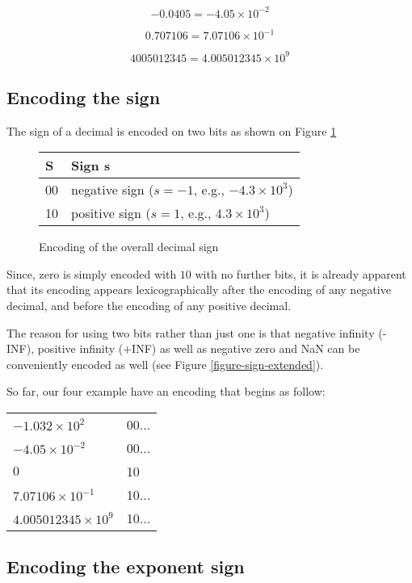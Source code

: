 \documentclass{acm_proc_article-sp}
\begin{document}
$$-0.0405 = -4.05 \times 10^{-2}$$

$$0.707106 = 7.07106 \times 10^{-1}$$

$$4005012345 = 4.005012345 \times 10^9$$


\subsection{Encoding the sign}

The sign of a decimal is encoded on two bits as shown on Figure \ref{figure-sign}

\begin{figure}
\caption{Encoding of the overall decimal sign}
\label{figure-sign}
\center
\begin{tabular}{|l|l|}
\hline
S & Sign s \\
\hline
00 &  negative sign ($s=-1$, e.g., $-4.3\times10^3$)\\
\hline
10 & positive sign ($s=1$, e.g., $4.3\times10^3$)\\
\hline
\end{tabular}
\end{figure}

Since, zero is simply encoded with $10$ with no further bits, it is already apparent that its encoding appears lexicographically after the encoding of any negative decimal, and before the encoding of any positive decimal.

The reason for using two bits rather than just one is that negative infinity (-INF), positive infinity (+INF) as well as negative zero and NaN can be conveniently encoded as well (see Figure \ref{figure-sign-extended}).

So far, our four example have an encoding that begins as follow:

\begin{tabular}{l|l}
$- 1.032 \times 10^2$ & 00... \\

$-4.05 \times 10^{-2}$ & 00... \\

$0$ & 10 \\

$7.07106 \times 10^{-1}$ & 10... \\

$4.005012345 \times 10^9$ & 10...\\
\end{tabular}
\subsection{Encoding the exponent sign}
\end{document}
